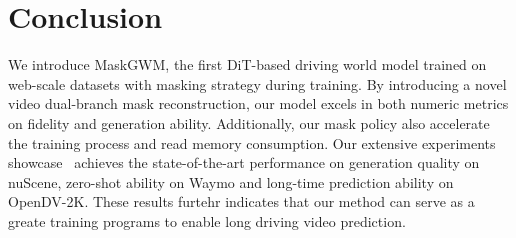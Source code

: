 \section{Conclusion}
\label{sec:conclusion}
We introduce MaskGWM, the first DiT-based driving world model trained on web-scale datasets with masking strategy during training. By introducing a novel video dual-branch mask reconstruction, our model excels in both numeric metrics on fidelity and generation ability. Additionally, our mask policy also accelerate the training process and read memory consumption. Our extensive experiments showcase \ourmethod\  achieves the state-of-the-art performance on generation quality on nuScene, zero-shot ability on Waymo and long-time prediction ability on OpenDV-2K. These results furtehr indicates that our method can serve as a greate training programs to enable long driving video prediction.
